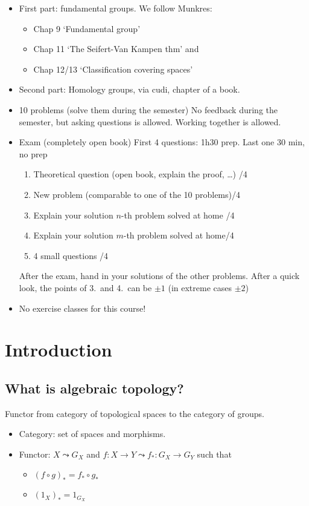 
\begin{itemize}
    \item First part: fundamental groups. We follow Munkres:
        \begin{itemize}
            \item Chap 9 `Fundamental group'
            \item Chap 11 `The Seifert-Van Kampen thm' and
            \item Chap 12/13 `Classification covering spaces'
        \end{itemize}
    \item Second part: Homology groups, via cudi, chapter of a book.
    \item 10 problems (solve them during the semester) No feedback during the semester, but asking questions is allowed. Working together is allowed.
    \item Exam (completely open book) First 4 questions: 1h30 prep. Last one 30 min, no prep
        \begin{enumerate}
            \item Theoretical question (open book, explain the proof, \ldots) \hfill /4
            \item New problem (comparable to one of the 10 problems)\hfill /4
            \item Explain your solution $n$-th problem solved at home \hfill /4
            \item Explain your solution $m$-th problem solved at home\hfill /4
            \item 4 small questions \hfill /4
        \end{enumerate}
        After the exam, hand in your solutions of the other problems. After a quick look, the points of 3.\ and 4.\ can be $\pm 1$ (in extreme cases $\pm 2$)
    \item No exercise classes for this course!
\end{itemize}

\setcounter{chapter}{0}
\chapter{Introduction}

\section{What is algebraic topology?}
Functor from category of topological spaces to the category of groups.
\begin{itemize}
    \item Category: set of spaces and morphisms.
    \item Functor: $X \leadsto G_X$ and  $f:X\to Y \leadsto f_*: G_X \to  G_Y$ such that
        \begin{itemize}
            \item $(f \circ g)_* = f_* \circ g_* $
            \item $(1_X)_* = 1_{G_X}$
        \end{itemize}
\end{itemize}

